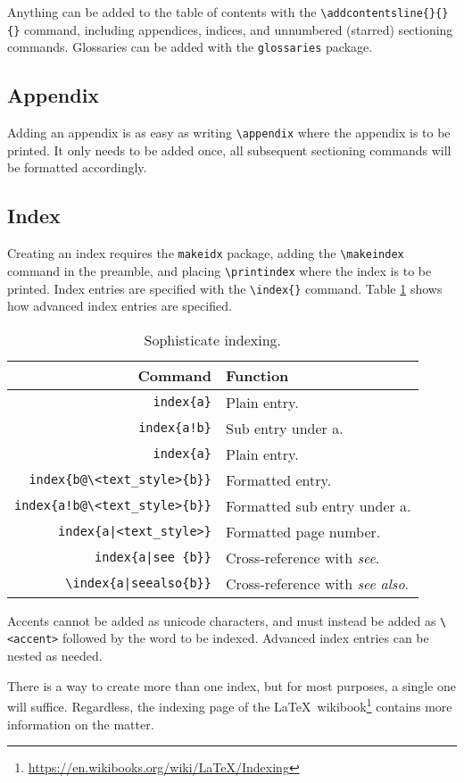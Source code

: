 Anything can be added to the table of contents with the \verb|\addcontentsline{}{}{}| command, including appendices, indices, and unnumbered (starred) sectioning commands. Glossaries can be added with the \verb|glossaries| package.
%
\subsection{Appendix}
%
Adding an appendix is as easy as writing \verb|\appendix| where the appendix is to be printed. It only needs to be added once, all subsequent sectioning commands will be formatted accordingly.
%
\subsection{Index}
%
Creating an index requires the \verb|makeidx| package, adding the \verb|\makeindex| command in the preamble, and placing \verb|\printindex| where the index is to be printed. Index entries are specified with the \verb|\index{}| command. Table \ref{t:index} shows how advanced index entries are specified.
\begin{table}[!htbp]
    \centering
    \caption{Sophisticate indexing.}
    \label{t:index}
    \begin{tabular}{rl}
        \toprule
        Command & Function \\
        \midrule
        \verb|index{a}| & Plain entry. \\
        \verb|index{a!b}| & Sub entry under a. \\
        \verb|index{a}| & Plain entry. \\
        \verb|index{b@\<text_style>{b}}| & Formatted entry. \\
        \verb|index{a!b@\<text_style>{b}}| & Formatted sub entry under a. \\
        \verb+index{a|<text_style>}+ & Formatted page number. \\
        \verb+index{a|see {b}}+ & Cross-reference with \emph{see}. \\
        \verb+\index{a|seealso{b}}+ & Cross-reference with \emph{see also}.\\
        \bottomrule
    \end{tabular}
\end{table}
Accents cannot be added as unicode characters, and must instead be added as \verb|\<accent>| followed by the word to be indexed. Advanced index entries can be nested as needed. 

There is a way to create more than one index, but for most purposes, a single one will suffice. Regardless, the indexing page of the \LaTeX~wikibook\footnote{\url{https://en.wikibooks.org/wiki/LaTeX/Indexing}} contains more information on the matter.
%
